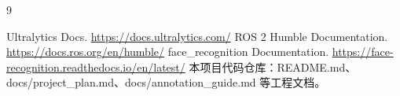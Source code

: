 \documentclass[12pt]{article}
\newcommand{\code}[1]{{\ttfamily #1}}
\begin{document}
\newpage
\begin{thebibliography}{9}
	 Ultralytics Docs. \url{https://docs.ultralytics.com/}
	 ROS 2 Humble Documentation. \url{https://docs.ros.org/en/humble/}
	 face\_recognition Documentation. \url{https://face-recognition.readthedocs.io/en/latest/}
	 本项目代码仓库：\code{README.md}、\code{docs/project\_plan.md}、\code{docs/annotation\_guide.md} 等工程文档。
\end{thebibliography}
\end{document}

